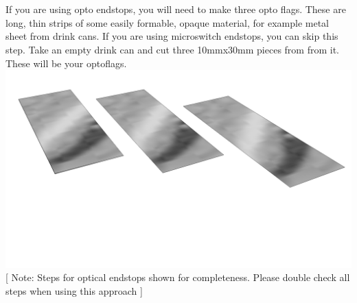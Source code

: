 \documentclass[twoside,a4paper,titlepage]{memoir}
\begin{document}
	\section{}
	If you are using opto endstops, you will need to make three opto flags. These are long, thin strips of
	some easily formable, opaque material, for example metal sheet from drink cans. If you are using
	microswitch endstops, you can skip this step. Take an empty drink can and cut three 10mmx30mm
	pieces from from it. These will be your optoflags.\\
	\includegraphics[width=1\linewidth]{graphics/ch10_3.png}	
	[ Note: Steps for optical endstops shown for completeness. Please double check all steps when using this approach ]
	
\end{document}
